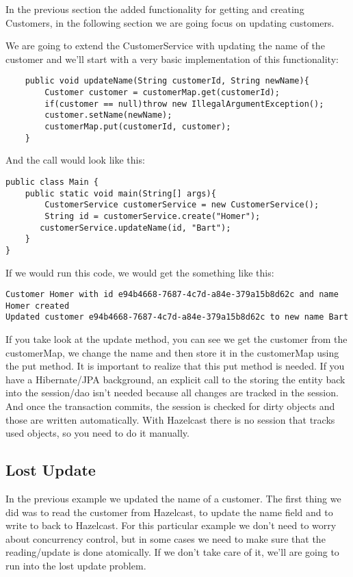 In the previous section the added functionality for getting and creating Customers, in the following section we are going focus on updating customers. 

We are going to extend the CustomerService with updating the name of the customer and we'll start with a very basic implementation of this functionality:

\begin{verbatim}
    public void updateName(String customerId, String newName){
        Customer customer = customerMap.get(customerId);
        if(customer == null)throw new IllegalArgumentException();
        customer.setName(newName);
        customerMap.put(customerId, customer);
    }
\end{verbatim}

And the call would look like this:

\begin{verbatim}
public class Main {
    public static void main(String[] args){
    	CustomerService customerService = new CustomerService();
    	String id = customerService.create("Homer");
       customerService.updateName(id, "Bart");
    }
}
\end{verbatim}

If we would run this code, we would get the something like this:

\begin{verbatim}
Customer Homer with id e94b4668-7687-4c7d-a84e-379a15b8d62c and name Homer created
Updated customer e94b4668-7687-4c7d-a84e-379a15b8d62c to new name Bart
\end{verbatim}

If you take look at the update method, you can see we get the customer from the customerMap, we change the name and then store it in the customerMap using the put method. It is important to realize that this put method is needed. If you have a Hibernate/JPA background, an explicit call to the storing the entity back into the session/dao isn't needed because all changes are tracked in the session. And once the transaction commits, the session is checked for dirty objects and those are written automatically. With Hazelcast there is no session that tracks used objects, so you need to do it manually. 

\subsection{Lost Update}

In the previous example we updated the name of a customer. The first thing we did was to read the customer from Hazelcast, to update the name field and to write to back to Hazelcast. For this particular example we don't need to worry about concurrency control, but in some cases we need to make sure that the reading/update is done atomically. If we don't take care of it, we'll are going to run into the lost update problem.

